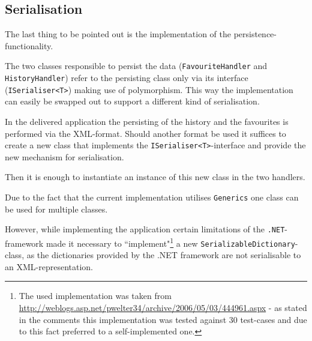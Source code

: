 \subsection{Serialisation}

The last thing to be pointed out is the implementation of the persistence-functionality.

The two classes responsible to persist the data (\texttt{FavouriteHandler} and \texttt{HistoryHandler}) refer to the persisting class only via its interface (\texttt{ISerialiser<T>}) making use of polymorphism. This way the implementation can easily be swapped out to support a different kind of serialisation.

In the delivered application the persisting of the history and the favourites is performed via the \ac{XML}-format. Should another format be used it suffices to create a new class that implements the \texttt{ISerialiser<T>}-interface and provide the new mechanism for serialisation.

Then it is enough to instantiate an instance of this new class in the two handlers.

Due to the fact that the current implementation utilises \texttt{Generics} one class can be used for multiple classes.

However, while implementing the application certain limitations of the \texttt{.NET}-framework made it necessary to ``implement"\footnote{The used implementation was taken from \url{http://weblogs.asp.net/pwelter34/archive/2006/05/03/444961.aspx} - as stated in the comments this implementation was tested against 30 test-cases and due to this fact preferred to a self-implemented one.} a new \texttt{SerializableDictionary}-class, as the dictionaries provided by the .NET framework are not serialisable to an \ac{XML}-representation.
